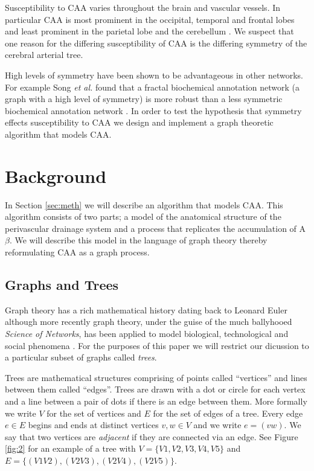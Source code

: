 \documentclass[10pt]{amsart} %
\theoremstyle{definition}
\begin{document}
Susceptibility to CAA varies throughout the brain and vascular vessels.  In particular  
CAA  is most prominent in the occipital, temporal and frontal lobes and least prominent in the parietal lobe and the cerebellum %
\cite{Preston}. We suspect that one reason for the differing susceptibility of CAA is the differing symmetry of the cerebral 
arterial tree.  

High levels of symmetry have been shown to be advantageous in other networks.  For example Song \emph{et al.} found that a 
fractal biochemical annotation  network (a graph with a high level of symmetry) is more robust than a less symmetric 
biochemical annotation  network \cite{Song}.  In order to test the hypothesis that symmetry effects susceptibility to CAA we
design and implement a graph theoretic algorithm that models CAA.%


\section{Background}

In Section \ref{sec:meth} we will describe an algorithm that models CAA.  This algorithm consists of two parts; a model of the
anatomical structure of the perivascular drainage system and a process that replicates the accumulation of A$\beta$.  We will 
describe this model in the language of graph theory thereby reformulating CAA as a graph process.      

\subsection{Graphs and Trees}
Graph theory has a rich mathematical history dating back to Leonard Euler although more recently graph theory, under the guise
of the much ballyhooed \emph{Science of Networks}, has been applied to model biological, technological and social 
phenomena \cite{barabasi}. For the purposes of this paper we will restrict our dicussion to a particular subset of graphs 
called \emph{trees}.   

Trees are mathematical structures comprising of points called ``vertices'' and lines between them called ``edges''.  Trees 
are drawn with a dot or circle for each vertex and a line between a pair of dots if there is an edge between them.  More formally we write $V$ for the set of vertices and $E$ for the set 
of edges of a tree.  Every edge $e \in E$ begins and ends at distinct vertices $ v,w \in V$ and we write $e = (vw)$. We say that two vertices are 
\emph{adjacent} if they are connected via an edge. See Figure \ref{fig:2} for an example of a tree with $V = \{V1,V2,V3,V4,V5\}$
and $E = \{(V1V2),(V2V3),(V2V4),(V2V5)\}$.
\end{document}
